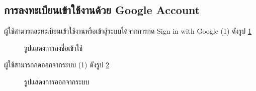 \subsection{การลงทะเบียนเข้าใช้งานด้วย Google Account}
ผู้ใช้สามารถละทะเบียนเข้าใช้งานหรือเข้าสู้ระบบได้จากการกด Sign in with Google (1) ดังรูป \ref{fig:login-CP}
\begin{figure}[H]\centering
    \caption{รูปแสดงการลงชื่อเข้าใช้}\label{fig:login-CP}
\end{figure}
ผู้ใช้สามารถกดออกจากระบบ (1) ดังรูป \ref{fig:logout-CP}
\begin{figure}[H]\centering
    \caption{รูปแสดงการออกจากระบบ}\label{fig:logout-CP}
\end{figure}